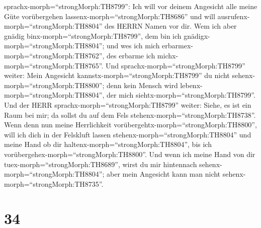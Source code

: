 sprachx-morph=``strongMorph:TH8799'': Ich will vor deinem Angesicht alle
meine Güte vorübergehen lassenx-morph=``strongMorph:TH8686'' und will
ausrufenx-morph=``strongMorph:TH8804'' des HERRN Namen vor dir. Wem ich
aber gnädig binx-morph=``strongMorph:TH8799'', dem bin ich
gnädigx-morph=``strongMorph:TH8804''; und wes ich mich
erbarmex-morph=``strongMorph:TH8762'', des erbarme ich
michx-morph=``strongMorph:TH8765''.  Und
sprachx-morph=``strongMorph:TH8799'' weiter: Mein Angesicht
kannstx-morph=``strongMorph:TH8799'' du nicht
sehenx-morph=``strongMorph:TH8800''; denn kein Mensch wird
lebenx-morph=``strongMorph:TH8804'', der mich
siehtx-morph=``strongMorph:TH8799''.  Und der HERR
sprachx-morph=``strongMorph:TH8799'' weiter: Siehe, es ist ein Raum bei
mir; da sollst du auf dem Fels stehenx-morph=``strongMorph:TH8738''.
 Wenn denn nun meine Herrlichkeit
vorübergehtx-morph=``strongMorph:TH8800'', will ich dich in der
Felskluft lassen stehenx-morph=``strongMorph:TH8804'' und meine Hand ob
dir haltenx-morph=``strongMorph:TH8804'', bis ich
vorübergehex-morph=``strongMorph:TH8800''.  Und wenn ich
meine Hand von dir tuex-morph=``strongMorph:TH8689'', wirst du mir
hintennach sehenx-morph=``strongMorph:TH8804''; aber mein Angesicht kann
man nicht sehenx-morph=``strongMorph:TH8735''.

\hypertarget{section-33}{%
\section{34}\label{section-33}}

